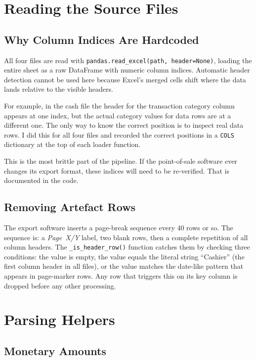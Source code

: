 \documentclass[12pt, a4paper]{report}
\begin{document}
\section{Reading the Source Files}

\subsection{Why Column Indices Are Hardcoded}

All four files are read with \texttt{pandas.read\_excel(path, header=None)}, loading
the entire sheet as a raw DataFrame with numeric column indices. Automatic header
detection cannot be used here because Excel's merged cells shift where the data
lands relative to the visible headers.

For example, in the cash file the header for the transaction category column appears
at one index, but the actual category values for data rows are at a different one.
The only way to know the correct position is to inspect real data rows. I did this
for all four files and recorded the correct positions in a \texttt{COLS} dictionary
at the top of each loader function.

This is the most brittle part of the pipeline. If the point-of-sale software ever
changes its export format, these indices will need to be re-verified. That is
documented in the code.

\subsection{Removing Artefact Rows}

The export software inserts a page-break sequence every 40 rows or so. The sequence
is: a \textit{Page~X/Y} label, two blank rows, then a complete repetition of all
column headers. The \texttt{\_is\_header\_row()} function catches them by checking
three conditions: the value is empty, the value equals the literal string
``Cashier'' (the first column header in all files), or the value matches the
date-like pattern that appears in page-marker rows. Any row that triggers this on
its key column is dropped before any other processing.

\section{Parsing Helpers}

\subsection{Monetary Amounts}
\end{document}
